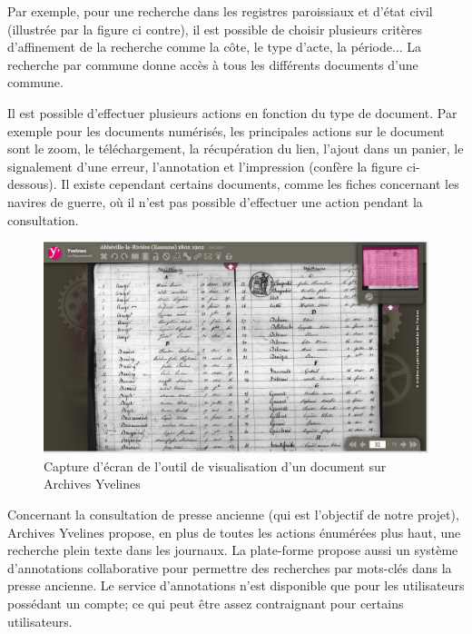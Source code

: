         Par exemple, pour une recherche dans les registres paroissiaux et d’état civil (illustrée par la figure ci contre),
        il est possible de choisir plusieurs critères d’affinement de la recherche comme la côte, le type d’acte, la période...
        La recherche par commune donne accès à tous les différents documents d’une commune.

        Il est possible d’effectuer plusieurs actions en fonction du type de document.
        Par exemple pour les documents numérisés, les principales actions sur le document sont le zoom, le téléchargement,
        la récupération du lien, l’ajout dans un panier, le signalement d’une erreur, l’annotation et l’impression (confère la figure ci-dessous).
         Il existe cependant certains documents, comme les fiches concernant les navires de guerre, où il n’est pas possible
         d’effectuer une action pendant la consultation.

        \begin{figure}[H]
            \centering
            \includegraphics[width=1\textwidth]{figure/screen_yvelines_document.png}
            \caption{Capture d'écran de l'outil de visualisation d'un document sur Archives Yvelines}
            \label{fig:yvelines_doc}
        \end{figure}

        Concernant la consultation de presse ancienne (qui est l’objectif de notre projet), Archives Yvelines
        propose, en plus de toutes les actions énumérées plus haut, une recherche plein texte dans les journaux.
        La plate-forme propose aussi un système d’annotations collaborative pour permettre des recherches
        par mots-clés dans la presse ancienne. Le service d’annotations n’est disponible que pour les utilisateurs
        possédant un compte; ce qui peut être assez contraignant pour certains utilisateurs.

